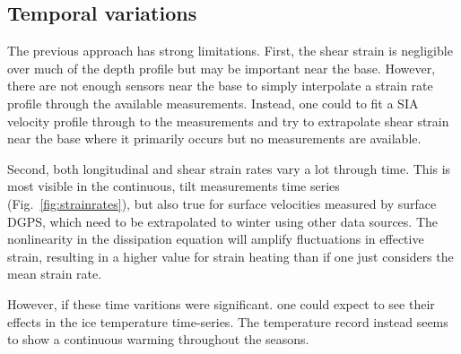 \documentclass[utf8]{article}
\begin{document}
\subsection{Temporal variations}

    The previous approach has strong limitations.  First, the shear strain is
    negligible over much of the depth profile but may be important near the
    base. However, there are not enough sensors near the base to simply
    interpolate a strain rate profile through the available measurements.
    Instead, one could to fit a SIA velocity profile through to the
    measurements and try to extrapolate shear strain near the base where it
    primarily occurs but no measurements are available.

    Second, both longitudinal and shear strain rates vary a lot through time.
    This is most visible in the continuous, tilt measurements time series
    (Fig.~\ref{fig:strainrates}), but also true for surface velocities
    measured by surface DGPS, which need to be extrapolated to winter using
    other data sources. The nonlinearity in the dissipation equation will
    amplify fluctuations in effective strain, resulting in a higher value for
    strain heating than if one just considers the mean strain rate.

    However, if these time varitions were significant. one could expect to see
    their effects in the ice temperature time-series. The temperature record
    instead seems to show a continuous warming throughout the seasons.



\end{document}
